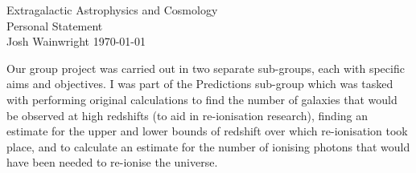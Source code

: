 
\makeatletter
\renewcommand{\@maketitle}{
\newpage
 \null
 \vskip 2em%
 \begin{center}%
  {\Large \@title \par}%
 \end{center}%
 \par} \makeatother

\begin{center}
\huge Extragalactic Astrophysics and Cosmology\\Personal Statement\\[1em]
\Large Josh Wainwright \hfill \today
\end{center}

Our group project was carried out in two separate sub-groups, each with specific aims and objectives. I was part of the Predictions sub-group which was tasked with performing original calculations to find the number of galaxies that would be observed at high redshifts (to aid in re-ionisation research), finding an estimate for the upper and lower bounds of redshift over which re-ionisation took place, and to calculate an estimate for the number of ionising photons that would have been needed to re-ionise the universe.

